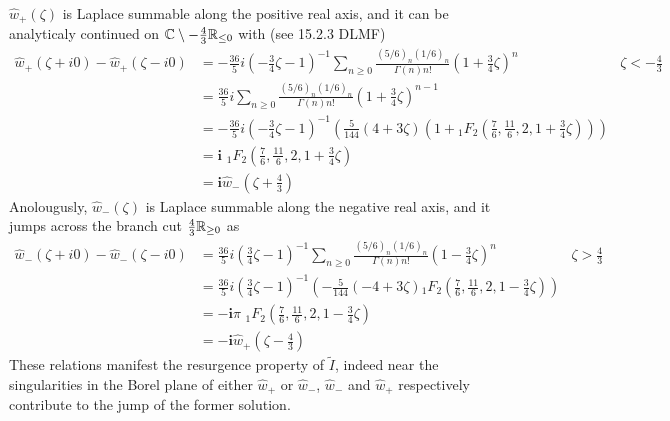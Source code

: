 \documentclass[11pt,a4paper,twoside,leqno,noamsfonts]{amsart}
\numberwithin{equation}{section}
\begin{document}
\begin{example}[Airy]
\begin{remark}
$\hat{w}_{+}(\zeta)$ is Laplace summable along the positive real axis, and it can be analyticaly continued on $\mathbb C\setminus -\frac{4}{3}\mathbb R_{\leq 0}$ with (see 15.2.3 DLMF)
\begin{align*}
\hat{w}_+(\zeta+i0)-\hat{w}_+(\zeta-i0)&=-\frac{36}{5}i(-\frac{3}{4}\zeta-1)^{-1}\sum_{n\geq 0}\frac{(5/6)_n(1/6)_n}{\Gamma(n)n!}(1+\frac{3}{4}\zeta)^n &\zeta<-\frac{4}{3}\\
&=\frac{36}{5}i\sum_{n\geq 0}\frac{(5/6)_n(1/6)_n}{\Gamma(n)n!}(1+\frac{3}{4}\zeta)^{n-1} & \\
&=-\frac{36}{5}i(-\frac{3}{4}\zeta-1)^{-1}\left(\frac{5}{144} (4 + 3 \zeta)\left(1+{}_{1}F_{2}\left(\frac{7}{6},\frac{11}{6},2,1+\frac{3}{4}\zeta\right)\right)\right) &\\
&=\mathbf{i}\,\,{}_{1}F_{2}\left(\frac{7}{6},\frac{11}{6},2,1+\frac{3}{4}\zeta\right) &\\
&=\mathbf{i}\hat{w}_{-}(\zeta+\frac{4}{3}) &
\end{align*}
Anolougusly, $\hat{w}_-(\zeta)$ is Laplace summable along the negative real axis, and it jumps across the branch cut $\frac{4}{3}\mathbb R_{\geq 0}$ as 
\begin{align*}
\hat{w}_-(\zeta+i0)-\hat{w}_-(\zeta-i0)&=\frac{36}{5}i(\frac{3}{4}\zeta-1)^{-1}\sum_{n\geq 0}\frac{(5/6)_n(1/6)_n}{\Gamma(n)n!}(1-\frac{3}{4}\zeta)^n & \zeta>\frac{4}{3}\\
&=\frac{36}{5}i(\frac{3}{4}\zeta-1)^{-1}\left(-\frac{5}{144}(-4+3\zeta){}_{1}F_{2}\left(\frac{7}{6},\frac{11}{6},2,1-\frac{3}{4}\zeta\right)\right)  &\\
&=-\mathbf{i}\pi\,\,{}_{1}F_{2}\left(\frac{7}{6},\frac{11}{6},2,1-\frac{3}{4}\zeta\right) &\\
&=-\mathbf{i}\hat{w}_{+}(\zeta-\frac{4}{3}) &
\end{align*}
These relations manifest the resurgence property of $\tilde{I}$, indeed near the singularities in the Borel plane of either $\hat{w}_+$ or $\hat{w}_-$, $\hat{w}_-$ and $\hat{w}_+$ respectively contribute to the jump of the former solution.  
\end{remark}


\end{example}
\end{document}
